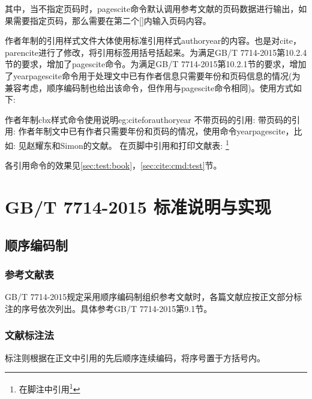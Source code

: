 其中，当不指定页码时，pagescite命令默认调用参考文献的页码数据进行输出，如果需要指定页码，那么需要在第二个[]内输入页码内容。


作者年制的引用样式文件大体使用标准引用样式authoryear的内容。也是对cite，parencite进行了修改，将引用标签用括号括起来。为满足GB/T 7714-2015第10.2.4节的要求，增加了pagescite命令。为满足GB/T 7714-2015第10.2.1节的要求，增加了yearpagescite命令用于处理文中已有作者信息只需要年份和页码信息的情况(为兼容考虑，顺序编码制也给出该命令，但作用与pagescite命令相同)。使用方式如下:

\begin{codetex}{作者年制cbx样式命令使用说明}{eg:citeforauthoryear}
不带页码的引用:
    \cite{Peebles2001-100-100}  \parencite{Miroslav2004--}
带页码的引用:
    \cite[见][49页]{蔡敏2006--} \parencite[见][49页]{Miroslav2004--}
     
作者年制文中已有作者只需要年份和页码的情况，使用命令yearpagescite，比如:
    见赵耀东和Simon的文献。
在页脚中引用和打印文献表:
    \footnote{在脚注中引用\footcite{赵学功2001--}} 
\end{codetex}

各引用命令的效果见\ref{sec:test:book}，\ref{sec:cite:cmd:test}节。

\section{GB/T 7714-2015 标准说明与实现}

\subsection{顺序编码制}

\subsubsection{参考文献表}\label{sec:bib:serialno}

GB/T 7714-2015规定采用顺序编码制组织参考文献时，各篇文献应按正文部分标注的序号依次列出。具体参考GB/T 7714-2015第9.1节。

\subsubsection{文献标注法}
标注则根据在正文中引用的先后顺序连续编码，将序号置于方括号内。

